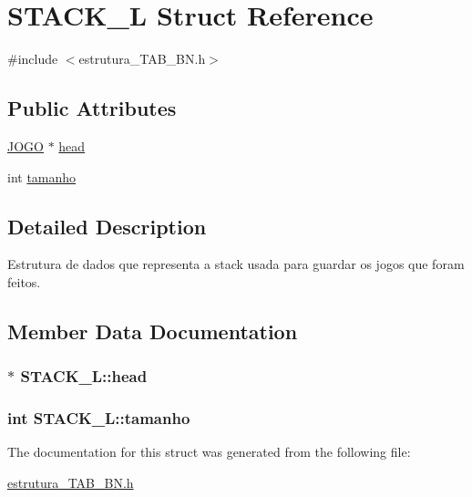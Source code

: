 \hypertarget{structSTACK__L}{\section{S\-T\-A\-C\-K\-\_\-\-L Struct Reference}
\label{structSTACK__L}
}


{\ttfamily \#include $<$estrutura\-\_\-\-T\-A\-B\-\_\-\-B\-N.\-h$>$}

\subsection*{Public Attributes}
\begin{DoxyCompactItemize}
\item 
\hyperlink{structJOGO}{J\-O\-G\-O} $\ast$ \hyperlink{structSTACK__L_a69c7e0a8504ed82dd11589aa0c714023}{head}
\item 
int \hyperlink{structSTACK__L_ac478e0116a0c43b0f3a69999d8ed4a13}{tamanho}
\end{DoxyCompactItemize}


\subsection{Detailed Description}
Estrutura de dados que representa a stack usada para guardar os jogos que foram feitos. 

\subsection{Member Data Documentation}
\hypertarget{structSTACK__L_a69c7e0a8504ed82dd11589aa0c714023}{
\subsubsection[{head}]{$\ast$ S\-T\-A\-C\-K\-\_\-\-L\-::head}}\label{structSTACK__L_a69c7e0a8504ed82dd11589aa0c714023}
\hypertarget{structSTACK__L_ac478e0116a0c43b0f3a69999d8ed4a13}{
\subsubsection[{tamanho}]{\setlength{\rightskip}{0pt plus 5cm}int S\-T\-A\-C\-K\-\_\-\-L\-::tamanho}}\label{structSTACK__L_ac478e0116a0c43b0f3a69999d8ed4a13}


The documentation for this struct was generated from the following file\-:\begin{DoxyCompactItemize}
\item 
\hyperlink{estrutura__TAB__BN_8h}{estrutura\-\_\-\-T\-A\-B\-\_\-\-B\-N.\-h}\end{DoxyCompactItemize}
